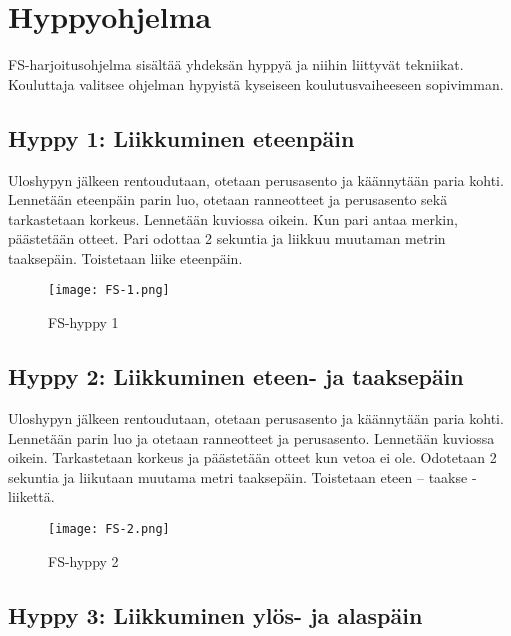 \section{ Hyppyohjelma }
\label{fs-kuviohyppaaminen-hyppyohjelma}


FS-harjoitusohjelma sisältää yhdeksän hyppyä ja niihin liittyvät tekniikat. Kouluttaja valitsee ohjelman hypyistä kyseiseen koulutusvaiheeseen sopivimman. 

\subsection{ Hyppy 1: Liikkuminen eteenpäin }
\label{fs-kuviohyppaaminen-hyppy-1-liikkuminen-eteenpain}


Uloshypyn jälkeen rentoudutaan, otetaan perusasento ja käännytään paria kohti. Lennetään eteenpäin parin luo, otetaan ranneotteet ja perusasento sekä tarkastetaan korkeus. Lennetään kuviossa oikein. Kun pari antaa merkin, päästetään otteet. Pari odottaa 2 sekuntia ja liikkuu muutaman metrin taaksepäin. Toistetaan liike eteenpäin. 


\begin{figure*}[]\centering\texttt{[image: FS-1.png]}\caption{FS-hyppy 1}\end{figure*} 

\subsection{ Hyppy 2: Liikkuminen eteen- ja taaksepäin }
\label{fs-kuviohyppaaminen-hyppy-2-liikkuminen-eteen-ja-taaksepain}


Uloshypyn jälkeen rentoudutaan, otetaan perusasento ja käännytään paria kohti. Lennetään parin luo ja otetaan ranneotteet ja perusasento. Lennetään kuviossa oikein. Tarkastetaan korkeus ja päästetään otteet kun vetoa ei ole. Odotetaan 2 sekuntia ja liikutaan muutama metri taaksepäin. Toistetaan eteen – taakse -liikettä. 


\begin{figure*}[]\centering\texttt{[image: FS-2.png]}\caption{FS-hyppy 2}\end{figure*} 

\subsection{ Hyppy 3: Liikkuminen ylös- ja alaspäin }
\label{fs-kuviohyppaaminen-hyppy-3-liikkuminen-ylos-ja-alaspain}


